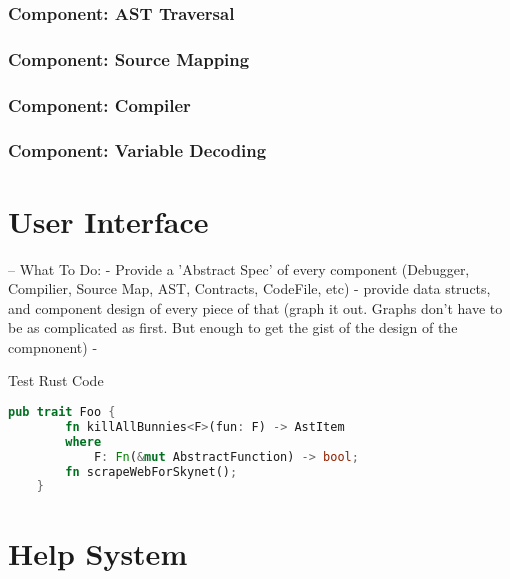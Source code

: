 \documentclass{report}
\begin{document}
    \subsubsection{Component: AST Traversal}
    \subsubsection{Component: Source Mapping}
    \subsubsection{Component: Compiler}
    \subsubsection{Component: Variable Decoding}

\section{User Interface}

-- What To Do:
    - Provide a 'Abstract Spec' of every component (Debugger, Compilier, Source Map, AST, Contracts, CodeFile, etc)
        - provide data structs, and component design of every piece of that (graph it out. Graphs don't have to be as complicated as first. But enough to get the gist of the design of the compnonent)
        -

Test Rust Code
\begin{lstlisting}[language=Rust]
    pub trait Foo {
        fn killAllBunnies<F>(fun: F) -> AstItem
        where
            F: Fn(&mut AbstractFunction) -> bool;
        fn scrapeWebForSkynet();
    }
\end{lstlisting}
\section{Help System}

\section{}
\end{document}
